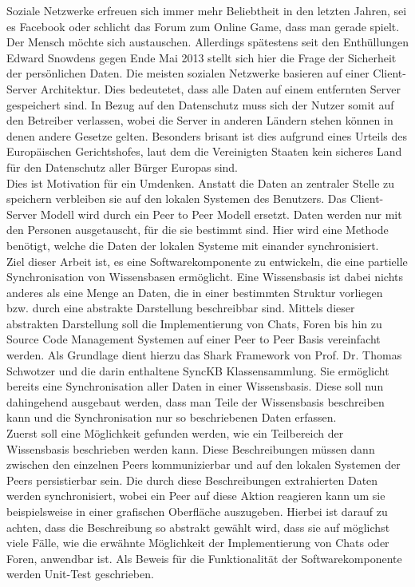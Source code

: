 \documentclass[a4paper]{article}
\begin{document}
	Soziale Netzwerke erfreuen sich immer mehr Beliebtheit in den letzten Jahren, 
	sei es Facebook oder schlicht das Forum zum Online Game, dass man gerade
	spielt. Der Mensch möchte sich austauschen. Allerdings spätestens seit den
	Enthüllungen Edward Snowdens gegen Ende Mai 2013 stellt sich hier die Frage
	der Sicherheit der persönlichen Daten. Die meisten sozialen Netzwerke basieren
	auf einer Client-Server Architektur. Dies bedeutetet, dass alle Daten auf einem
	entfernten Server gespeichert sind. In Bezug auf den Datenschutz muss sich der
	Nutzer somit auf den Betreiber verlassen, wobei die
	Server in anderen Ländern stehen können in denen andere Gesetze gelten.
	Besonders brisant ist dies aufgrund eines
	Urteils des Europäischen Gerichtshofes, laut dem die Vereinigten Staaten kein
	sicheres Land für den Datenschutz aller Bürger Europas sind. \cite{welt} \\
	 
	Dies ist Motivation für ein Umdenken. Anstatt die Daten an zentraler Stelle
	zu speichern verbleiben sie auf den lokalen Systemen des Benutzers. Das
	Client-Server Modell wird durch ein Peer to Peer Modell ersetzt. Daten
	werden nur mit den Personen ausgetauscht, für die sie bestimmt sind.
	Hier wird eine Methode benötigt, welche die Daten der lokalen Systeme
	mit einander synchronisiert. \\

	Ziel dieser Arbeit ist, es eine Softwarekomponente zu entwickeln, die eine 
	partielle Synchronisation von Wissensbasen ermöglicht. Eine Wissensbasis
	ist dabei nichts anderes als eine Menge an Daten, die in einer
	bestimmten Struktur vorliegen bzw. durch eine abstrakte Darstellung
	beschreibbar sind. Mittels dieser abstrakten Darstellung soll die 
	Implementierung von Chats, Foren bis hin zu Source Code Management Systemen
	auf einer Peer to Peer Basis vereinfacht werden.
	Als Grundlage dient hierzu das Shark Framework \cite{SharkFW} von Prof.
	Dr.	Thomas Schwotzer und die darin enthaltene SyncKB Klassensammlung. Sie
	ermöglicht bereits eine Synchronisation aller Daten in einer Wissensbasis.
	Diese soll nun dahingehend ausgebaut werden, dass man Teile der Wissensbasis
	beschreiben kann und die Synchronisation nur so beschriebenen Daten erfassen. \\
	
	Zuerst soll eine Möglichkeit gefunden werden, wie ein Teilbereich der
	Wissensbasis beschrieben werden kann. Diese Beschreibungen müssen dann
	zwischen den einzelnen Peers kommunizierbar und auf den lokalen Systemen der
	Peers persistierbar sein. Die durch diese Beschreibungen extrahierten Daten
	werden synchronisiert, wobei ein Peer auf diese Aktion reagieren kann um
	sie beispielsweise in einer grafischen Oberfläche auszugeben. Hierbei
	ist darauf zu achten, dass die Beschreibung so abstrakt gewählt wird, dass 
	sie	auf möglichst viele Fälle, wie die erwähnte Möglichkeit der 
	Implementierung von Chats oder Foren, anwendbar ist. Als Beweis für die
	Funktionalität der Softwarekomponente werden Unit-Test geschrieben. \\
	
\end{document}
